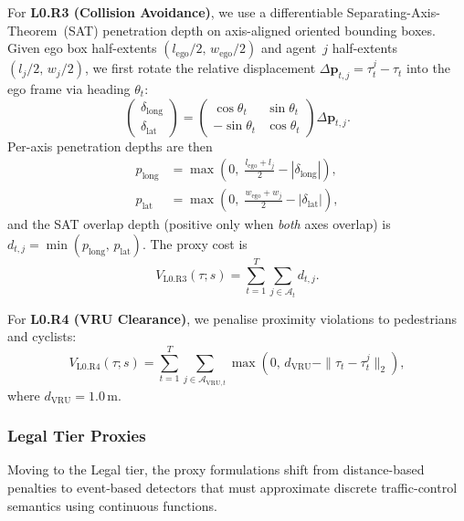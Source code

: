 For \textbf{L0.R3 (Collision Avoidance)}, we use a differentiable Separating-Axis-Theorem~(SAT) penetration depth on axis-aligned oriented bounding boxes.  Given ego box half-extents $(l_{\text{ego}}/2,\,w_{\text{ego}}/2)$ and agent~$j$ half-extents $(l_j/2,\,w_j/2)$, we first rotate the relative displacement $\Delta\mathbf{p}_{t,j}=\tau_t^j-\tau_t$ into the ego frame via heading $\theta_t$:
\begin{equation}
\begin{pmatrix}\delta_{\text{long}}\\\delta_{\text{lat}}\end{pmatrix}
=
\begin{pmatrix}\cos\theta_t & \sin\theta_t\\-\sin\theta_t & \cos\theta_t\end{pmatrix}
\Delta\mathbf{p}_{t,j}.
\end{equation}
Per-axis penetration depths are then
\begin{align}
p_{\text{long}} &= \max\!\left(0,\;\tfrac{l_{\text{ego}}+l_j}{2}-|\delta_{\text{long}}|\right),\\
p_{\text{lat}}  &= \max\!\left(0,\;\tfrac{w_{\text{ego}}+w_j}{2}-|\delta_{\text{lat}}|\right),
\end{align}
and the SAT overlap depth (positive only when \emph{both} axes overlap) is $d_{t,j}=\min(p_{\text{long}},\,p_{\text{lat}})$.  The proxy cost is
\begin{equation}
V_{\text{L0.R3}}(\tau; s)=\sum_{t=1}^{T}\sum_{j\in\mathcal{A}_t}d_{t,j}.
\end{equation}

For \textbf{L0.R4 (VRU Clearance)}, we penalise proximity violations to pedestrians and cyclists:
\begin{equation}
V_{\text{L0.R4}}(\tau; s)=\sum_{t=1}^{T}\sum_{j\in\mathcal{A}_{\text{VRU},t}}\max\!\left(0,\,d_{\text{VRU}}-\|\tau_t-\tau_t^{j}\|_2\right),
\end{equation}
where $d_{\text{VRU}}{=}1.0\,\mathrm{m}$.

\subsubsection{Legal Tier Proxies}

Moving to the Legal tier, the proxy formulations shift from distance-based penalties to event-based detectors that must approximate discrete traffic-control semantics using continuous functions.

